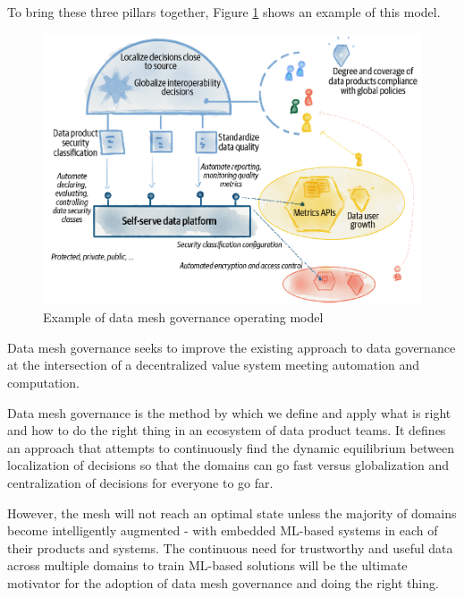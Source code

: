 \documentclass[12pt, a4paper]{book}
\begin{document}
To bring these three pillars together, Figure \ref{DataGov} shows an example of this model.

\begin{figure}[h]
	\begin{framed}
		\centering
		\includegraphics[width=12cm]{DataGov.png}
		\caption{Example of data mesh governance operating model}
		\label{DataGov}
	\end{framed}
\end{figure}

Data mesh governance seeks to improve the existing approach to data governance at the intersection of a decentralized value system meeting automation and computation.

Data mesh governance is the method by which we define and apply what is right and how to do the right thing in an ecosystem of data product teams. It defines an approach that attempts to continuously find the dynamic equilibrium between localization of decisions so that the domains can go fast versus globalization and centralization of decisions for everyone to go far.

However, the mesh will not reach an optimal state unless the majority of domains become intelligently augmented - with embedded ML-based systems in each of their products and systems. The continuous need for trustworthy and useful data across multiple domains to train ML-based solutions will be the ultimate motivator for the adoption of data mesh governance and doing the right thing.
\end{document}
